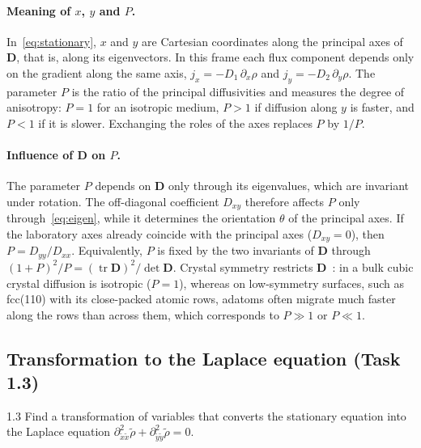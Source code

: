 \documentclass[11pt,a4paper]{article}
\numberwithin{equation}{section}
\theoremstyle{definition}
\theoremstyle{remark}
\newcommand{\bD}{\mathbf{D}}
\begin{document}
\paragraph{Meaning of $x$, $y$ and $P$.} In~\eqref{eq:stationary}, $x$ and $y$ are
Cartesian coordinates along the principal axes of $\bD$, that is, along its eigenvectors.
In this frame each flux component depends only on the gradient along the same axis,
$j_x = -D_1\,\partial_x\rho$ and $j_y = -D_2\,\partial_y\rho$. The parameter $P$ is the
ratio of the principal diffusivities and measures the degree of anisotropy: $P = 1$ for
an isotropic medium, $P > 1$ if diffusion along $y$ is faster, and $P < 1$ if it is
slower. Exchanging the roles of the axes replaces $P$ by $1/P$.

\paragraph{Influence of $\bD$ on $P$.} The parameter $P$ depends on $\bD$ only through its
eigenvalues, which are invariant under rotation. The off-diagonal coefficient $D_{xy}$
therefore affects $P$ only through~\eqref{eq:eigen}, while it determines the orientation
$\theta$ of the principal axes. If the laboratory axes already coincide with the principal
axes ($D_{xy} = 0$), then $P = D_{yy}/D_{xx}$. Equivalently, $P$ is fixed by the two
invariants of $\bD$ through $(1 + P)^2/P = (\operatorname{tr}\bD)^2/\det\bD$. Crystal
symmetry restricts $\bD$~\citep{nye1985}: in a bulk cubic crystal diffusion is isotropic
($P = 1$), whereas on low-symmetry surfaces, such as fcc(110) with its close-packed
atomic rows, adatoms often migrate much faster along the rows than across them, which
corresponds to $P \gg 1$ or $P \ll 1$.

\subsection{Transformation to the Laplace equation (Task 1.3)}\label{sec:laplace}

\begin{task}{1.3}
  Find a transformation of variables that converts the stationary equation into the
  Laplace equation
  $\partial^2_{\tilde{x}\tilde{x}}\tilde{\rho} + \partial^2_{\tilde{y}\tilde{y}}\tilde{\rho} = 0$.
\end{task}
\end{document}
